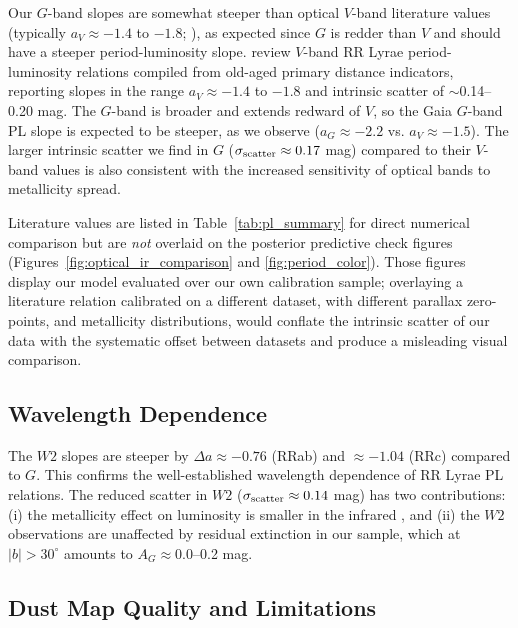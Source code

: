 \documentclass[10pt,preprint2]{aastex}
\begin{document}
Our $G$-band slopes are somewhat steeper than optical $V$-band literature values (typically $a_V \approx -1.4$ to $-1.8$; \citealt{Beaton2018}), as expected since $G$ is redder than $V$ and should have a steeper period-luminosity slope. \citet{Beaton2018} review $V$-band RR Lyrae period-luminosity relations compiled from old-aged primary distance indicators, reporting slopes in the range $a_V \approx -1.4$ to $-1.8$ and intrinsic scatter of $\sim$0.14--0.20 mag. The $G$-band is broader and extends redward of $V$, so the Gaia $G$-band PL slope is expected to be steeper, as we observe ($a_G \approx -2.2$ vs. $a_V \approx -1.5$). The larger intrinsic scatter we find in $G$ ($\sigma_{\rm scatter} \approx 0.17$ mag) compared to their $V$-band values is also consistent with the increased sensitivity of optical bands to metallicity spread.

Literature values are listed in Table~\ref{tab:pl_summary} for direct numerical comparison but are \textit{not} overlaid on the posterior predictive check figures (Figures~\ref{fig:optical_ir_comparison} and \ref{fig:period_color}). Those figures display our model evaluated over our own calibration sample; overlaying a literature relation calibrated on a different dataset, with different parallax zero-points, and metallicity distributions, would conflate the intrinsic scatter of our data with the systematic offset between datasets and produce a misleading visual comparison.

\subsection{Wavelength Dependence}

The $W2$ slopes are steeper by $\Delta a \approx -0.76$ (RRab) and $\approx -1.04$ (RRc) compared to $G$. This confirms the well-established wavelength dependence of RR Lyrae PL relations. The reduced scatter in $W2$ ($\sigma_{\rm scatter} \approx 0.14$ mag) has two contributions: (i) the metallicity effect on luminosity is smaller in the infrared \citep{CatelanSmith2015}, and (ii) the $W2$ observations are unaffected by residual extinction in our sample, which at $|b|>30^\circ$ amounts to $A_G \approx 0.0$--0.2 mag.

\subsection{Dust Map Quality and Limitations}
\end{document}

